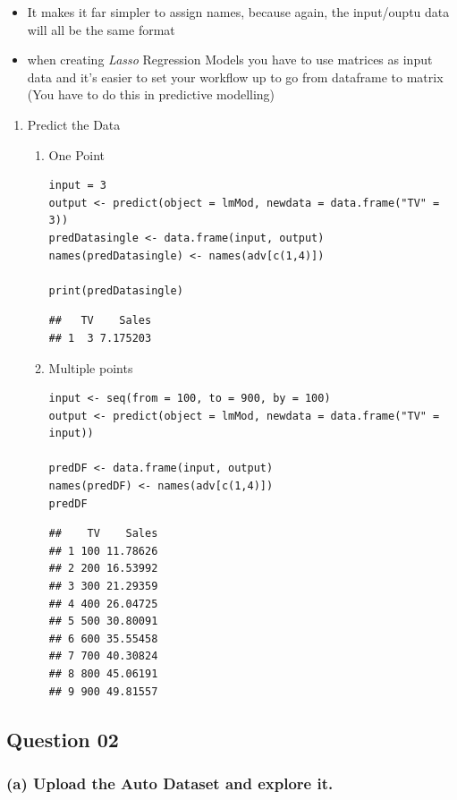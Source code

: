 \documentclass[11pt]{article}
\begin{document}
\begin{enumerate}
\begin{itemize}
\item It makes it far simpler to assign names, because again, the
input/ouptu data will all be the same format
\item when creating \emph{Lasso} Regression Models you have to use matrices as
input data and it's easier to set your workflow up to go from
dataframe to matrix (You have to do this in predictive modelling)
\end{itemize}
\begin{enumerate}
\item Predict the Data
\label{sec:org83ed81c}
\begin{enumerate}
\item One Point
\label{sec:orgb6099fd}
\begin{verbatim}
input = 3
output <- predict(object = lmMod, newdata = data.frame("TV" = 3))
predDatasingle <- data.frame(input, output)
names(predDatasingle) <- names(adv[c(1,4)])

print(predDatasingle)
\end{verbatim}

\begin{verbatim}
##   TV    Sales
## 1  3 7.175203
\end{verbatim}
\item Multiple points
\label{sec:org40327bb}
\begin{verbatim}
input <- seq(from = 100, to = 900, by = 100)
output <- predict(object = lmMod, newdata = data.frame("TV" = input))

predDF <- data.frame(input, output)
names(predDF) <- names(adv[c(1,4)])
predDF
\end{verbatim}

\begin{verbatim}
##    TV    Sales
## 1 100 11.78626
## 2 200 16.53992
## 3 300 21.29359
## 4 400 26.04725
## 5 500 30.80091
## 6 600 35.55458
## 7 700 40.30824
## 8 800 45.06191
## 9 900 49.81557
\end{verbatim}
\end{enumerate}
\end{enumerate}
\end{enumerate}
\subsection{Question 02}
\label{sec:orgdb41fa8}
\subsubsection{(a) Upload the Auto Dataset and explore it.}
\label{sec:org31ab181}
\end{document}

